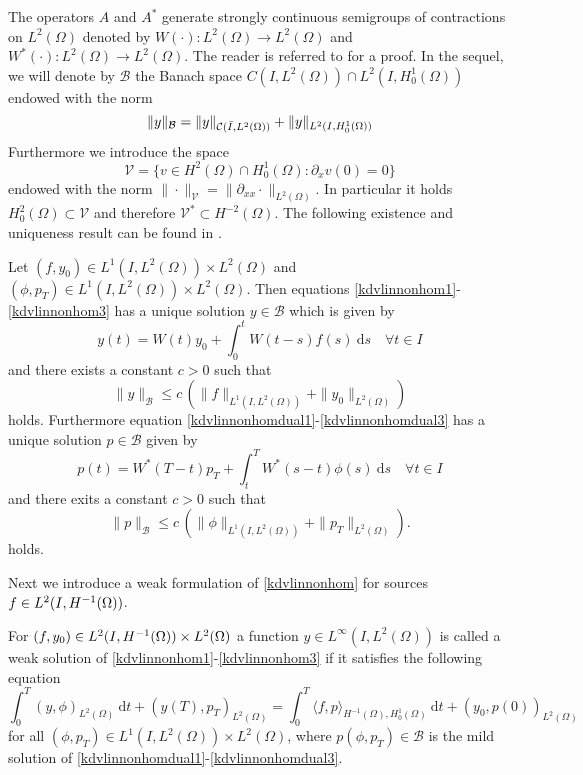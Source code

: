 The operators $A$ and $A^*$ generate strongly continuous semigroups of contractions on $L^{2}(\Omega)$ denoted by $W(\cdot)\colon L^2(\Omega)\rightarrow L^2(\Omega)$ and $W^*(\cdot)\colon L^2(\Omega)\rightarrow L^2(\Omega)$. The reader is referred to \cite{rosier1997exact} for a proof.  In the sequel, we will denote by $\mathcal{B}$ the Banach space
$C(I,L^2(\Omega))\cap L^2(I,H^1_0(\Omega))$ endowed with the norm
\[
\lVert y\rVert_{\mathcal{B}} = \lVert y\rVert_{\mathcal C(\bar I,L^2(\Omega))}+ \lVert y\rVert_{L^2(I,H^1_0(\Omega))}
\]
Furthermore we introduce the space
\[
\mathcal V =\{v\in H^2(\Omega)\cap H^1_0(\Omega)\colon \partial_xv(0)=0\}
\]
endowed with the norm $\|\cdot\|_{\mathcal V}=\|\partial_{xx}\cdot\|_{L^2(\Omega)}$. In particular it holds $H^2_0(\Omega)\subset\mathcal V$ and therefore $\mathcal V^*\subset H^{-2}(\Omega)$. The following existence and uniqueness result can be found in \cite[Section 2]{BonaSunZhang03}.
\begin{prop}\label{prop:ex smooth}
Let $(f,y_0)\in L^1(I,L^2(\Omega))\times L^2(\Omega)$ and $(\phi,p_T)\in L^1(I,L^2(\Omega))\times L^2(\Omega)$. Then equations \eqref{kdvlinnonhom1}-\eqref{kdvlinnonhom3} has a unique solution $y\in \mathcal B$ which is given by
\[
y(t)=W(t)y_0+\int_0^tW(t-s)f(s)~\mathrm ds\quad\forall t\in I
\]
and there exists a constant $c>0$ such that
\[
\|y\|_{\mathcal B}\leq c\,(\|f\|_{L^1(I,L^2(\Omega))}+\|y_0\|_{L^2(\Omega)})
\]
holds. Furthermore equation \eqref{kdvlinnonhomdual1}-\eqref{kdvlinnonhomdual3} has a unique solution $p\in \mathcal B$
given by
\[
p(t)=W^*(T-t)p_T+\int_t^TW^*(s-t)\phi(s)~\mathrm ds\quad\forall t\in I
\]
and there exits a constant $c>0$ such that
\[
\|p\|_{\mathcal B}\leq c\,(\|\phi\|_{L^1(I,L^2(\Omega))}+\|p_T\|_{L^2(\Omega)}).
\]
holds.
\end{prop}
Next we introduce a weak formulation of \eqref{kdvlinnonhom} for sources $f\in \Hm1$.
\begin{Def}
For $(f,y_0)\in \Hm1\times L^2(\Omega)$ a function $y\in L^\infty(I,L^2(\Omega))$ is called a weak solution of \eqref{kdvlinnonhom1}-\eqref{kdvlinnonhom3} if it satisfies the following equation
\begin{equation}\label{weakformlinearkdv}
\int_0^T(y,\phi)_{L^2(\Omega)}~\mathrm dt+(y(T),p_T)_{L^2(\Omega)}=\int_0^T\langle f,p\rangle_{H^{-1}(\Omega),H^1_0(\Omega)}~\mathrm dt+(y_0,p(0))_{L^2(\Omega)}
\end{equation}
for all $(\phi,p_T) \in L^1(I,L^2(\Omega))\times L^2(\Omega)$, where $p(\phi,p_T)\in \mathcal B$ is the mild solution of \eqref{kdvlinnonhomdual1}-\eqref{kdvlinnonhomdual3}.
\end{Def}
